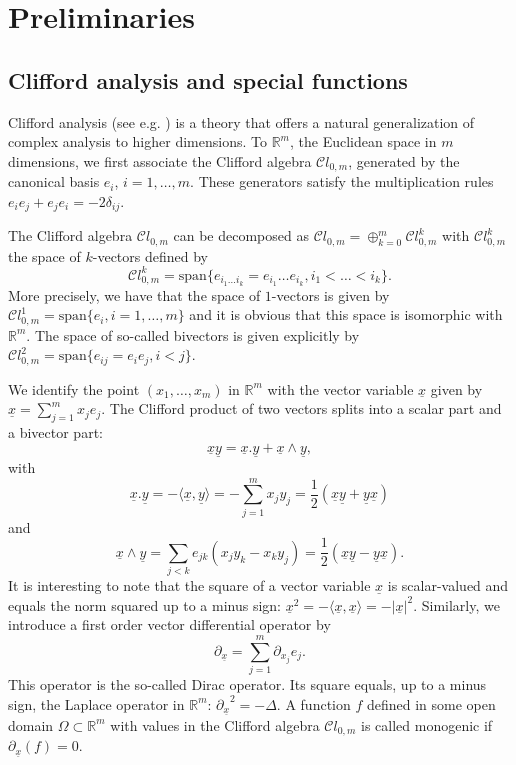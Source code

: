 \documentclass{amsart}
\theoremstyle{remark}
\begin{document}
\section{Preliminaries}
\setcounter{equation}{0}
\label{Preliminaries}

\subsection{Clifford analysis and special functions}
Clifford analysis (see e.g. \cite{MR1169463}) is a theory that offers a natural generalization of complex analysis to higher dimensions. To  ${\mathbb{R}}^{m}$, the Euclidean space in $m$ dimensions, we first associate the Clifford algebra ${\mathcal{C}} l_{0,m}$, generated by the canonical basis $e_{i}$, $i= 1, \ldots, m$. These generators satisfy the multiplication rules $e_{i} e_{j} + e_{j} e_{i} = - 2 \delta_{ij}$.

The Clifford algebra ${\mathcal{C}} l_{0,m}$ can be decomposed as ${\mathcal{C}} l_{0,m} = \oplus_{k=0}^{m} {\mathcal{C}} l_{0,m}^{k}$
with ${\mathcal{C}} l_{0,m}^{k}$ the space of $k$-vectors defined by
\[
{\mathcal{C}} l_{0,m}^{k} = \mbox{span} \{ e_{i_{1} \ldots i_{k}} = e_{i_{1}} \ldots e_{i_{k}}, i_{1} < \ldots < i_{k} \}.
\]
More precisely, we have that the space of $1$-vectors is given by ${\mathcal{C}} l_{0,m}^{1} = \mbox{span} \{ e_{i}, i = 1, \ldots, m \}$ 
and it is obvious that this space is isomorphic with ${\mathbb{R}}^{m}$. The space of so-called bivectors is given explicitly by ${\mathcal{C}} l_{0,m}^{2} = \mbox{span} \{ e_{ij}=e_{i} e_{j}, i < j \}$.

We identify the point $(x_{1}, \ldots, x_{m})$ in ${\mathbb{R}}^{m}$ with the vector variable ${\underline{x}}$ given by ${\underline{x}} = \sum_{j=1}^{m} x_{j} e_{j}$. The Clifford product of two vectors splits into a scalar part and a bivector part:
\[
{\underline{x}} {\underline{y}} = {\underline{x}} . {\underline{y}} + {\underline{x}} \wedge {\underline{y}},
\]
with
\[
{\underline{x}} . {\underline{y}} = - \langle {\underline{x}}, {\underline{y}} \rangle = -\sum_{j=1}^{m} x_{j} y_{j} = \frac{1}{2} ({\underline{x}} {\underline{y}} + {\underline{y}}  {\underline{x}})
\]
and
\[
{\underline{x}} \wedge {\underline{y}} = \sum_{j<k} e_{jk} (x_{j} y_{k} - x_{k}y_{j}) = \frac{1}{2} ({\underline{x}} {\underline{y}} - {\underline{y}}  {\underline{x}}).
\]
It is interesting to note that the square of a vector variable ${\underline{x}}$ is scalar-valued and equals the norm squared up to a minus sign: $
{\underline{x}}^{2} = - \langle {\underline{x}}, {\underline{x}} \rangle = - |{\underline{x}}|^{2}$.
Similarly, we introduce a first order vector differential operator by
\[
{\partial_{\underline{x}}} = \sum_{j=1}^{m} \partial_{x_{j}} e_{j}.
\]
This operator is the so-called Dirac operator. Its square equals, up to a minus sign, the Laplace operator in ${\mathbb{R}}^{m}$: ${\partial_{\underline{x}}}^{2} = - \Delta$. A function $f$ defined in some open domain $\Omega \subset {\mathbb{R}}^{m}$ with values in the Clifford algebra ${\mathcal{C}} l_{0,m}$ is called monogenic if ${\partial_{\underline{x}}} ( f ) = 0$.
\end{document}
